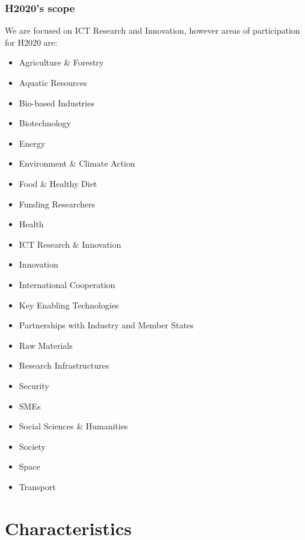 \documentclass[compress,9pt,xcolor={dvipsnames,table}]{beamer}
\begin{document}
\begin{frame}\frametitle{H2020's scope}
We are focused on ICT Research and Innovation, however areas of participation for H2020 are:
\begin{multicols}{2}
\begin{itemize}
  \item Agriculture \& Forestry
  \item Aquatic Resources
  \item Bio-based Industries
  \item Biotechnology
  \item Energy
  \item Environment \& Climate Action
  \item Food \& Healthy Diet
  \item Funding Researchers
  \item Health
  \item ICT Research \& Innovation
  \item Innovation
  \item International Cooperation
  \item Key Enabling Technologies
  \item Partnerships with Industry and Member States
  \item Raw Materials
  \item Research Infrastructures
  \item Security
  \item SMEs
  \item Social Sciences \& Humanities
  \item Society
  \item Space
  \item Transport
\end{itemize}
\end{multicols}
\end{frame}

\section{Characteristics}
\end{document}
